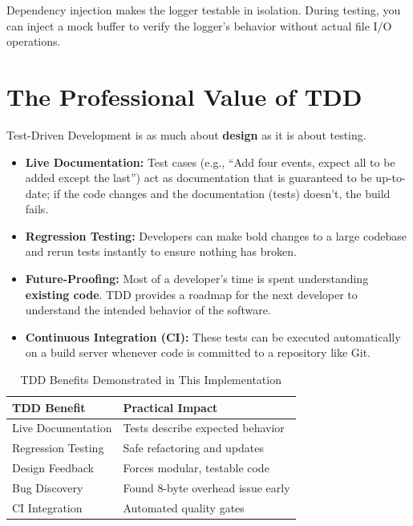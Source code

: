 \documentclass[11pt,a4paper]{article}
\begin{document}
\begin{notebox}
Dependency injection makes the logger testable in isolation. During testing, you can inject a mock buffer to verify the logger's behavior without actual file I/O operations.
\end{notebox}

\section{The Professional Value of TDD}

Test-Driven Development is as much about \textbf{design} as it is about testing.

\begin{itemize}[leftmargin=*]
    \item \textbf{Live Documentation:} Test cases (e.g., ``Add four events, expect all to be added except the last'') act as documentation that is guaranteed to be up-to-date; if the code changes and the documentation (tests) doesn't, the build fails.
    \item \textbf{Regression Testing:} Developers can make bold changes to a large codebase and rerun tests instantly to ensure nothing has broken.
    \item \textbf{Future-Proofing:} Most of a developer's time is spent understanding \textbf{existing code}. TDD provides a roadmap for the next developer to understand the intended behavior of the software.
    \item \textbf{Continuous Integration (CI):} These tests can be executed automatically on a build server whenever code is committed to a repository like Git.
\end{itemize}

\begin{table}[h]
\centering
\begin{tabular}{@{}ll@{}}
\toprule
\textbf{TDD Benefit} & \textbf{Practical Impact} \\
\midrule
Live Documentation & Tests describe expected behavior \\
Regression Testing & Safe refactoring and updates \\
Design Feedback & Forces modular, testable code \\
Bug Discovery & Found 8-byte overhead issue early \\
CI Integration & Automated quality gates \\
\bottomrule
\end{tabular}
\caption{TDD Benefits Demonstrated in This Implementation}
\end{table}
\end{document}
